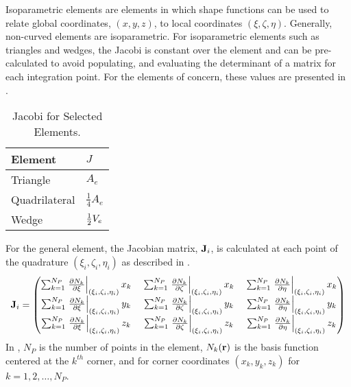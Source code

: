     Isoparametric elements are elements in which shape functions can be used to
    relate global coordinates, $(x,y,z)$, to local coordinates
    $(\xi,\zeta,\eta)$. Generally, non-curved elements are isoparametric. For
    isoparametric elements such as triangles and wedges, the Jacobi is constant
    over the element and can be pre-calculated to avoid populating, and
    evaluating the determinant of a matrix for each integration point. For the
    elements of concern, these values are presented in 
    \cite{textbookcolorado}.

    \begin{table}
      \caption{Jacobi for Selected Elements.}
      \label{tab:jacobi}
      \begin{center}
        \begin{tabular}{ll}
          \toprule
          Element & $J$ \\
          \midrule
          Triangle      & $A_e$ \\
          Quadrilateral & $\frac{1}{4} A_e$ \\
          Wedge         & $\frac{1}{2} V_e$ \\
          \bottomrule
        \end{tabular}
      \end{center}
    \end{table}

    For the general element, the Jacobian matrix, $\mathbf{J}_i$, is calculated at each
    point of the quadrature $(\xi_i,\zeta_i,\eta_i)$ as described in
    .
    \begin{equation}
      \label{eq:calcJacobian}
      \mathbf{J}_i = 
      \begin{pmatrix}
        \sum_{k=1}^{N_P} \left. \frac{\partial N_k}{\partial \xi}
          \right|_{(\xi_i,\zeta_i,\eta_i)} x_k   \; &
        \sum_{k=1}^{N_P} \left. \frac{\partial N_k}{\partial \zeta}
          \right|_{(\xi_i,\zeta_i,\eta_i)} x_k   \; &
        \sum_{k=1}^{N_P} \left. \frac{\partial N_k}{\partial \eta} 
          \right|_{(\xi_i,\zeta_i,\eta_i)} x_k   \\
        \sum_{k=1}^{N_P} \left. \frac{\partial N_k}{\partial \xi}
          \right|_{(\xi_i,\zeta_i,\eta_i)} y_k   \; &
        \sum_{k=1}^{N_P} \left. \frac{\partial N_k}{\partial \zeta} 
          \right|_{(\xi_i,\zeta_i,\eta_i)} y_k   \; &
        \sum_{k=1}^{N_P} \left. \frac{\partial N_k}{\partial \eta} 
          \right|_{(\xi_i,\zeta_i,\eta_i)} y_k   \\
        \sum_{k=1}^{N_P} \left. \frac{\partial N_k}{\partial \xi}
          \right|_{(\xi_i,\zeta_i,\eta_i)} z_k   \; &
        \sum_{k=1}^{N_P} \left. \frac{\partial N_k}{\partial \zeta} 
          \right|_{(\xi_i,\zeta_i,\eta_i)} z_k   \; &
        \sum_{k=1}^{N_P} \left. \frac{\partial N_k}{\partial \eta} 
          \right|_{(\xi_i,\zeta_i,\eta_i)} z_k   
      \end{pmatrix}
    \end{equation}
    In , $N_P$ is the number of points in the element, 
    $N_k(\mathbf{r})$ is the basis function centered at the $k^{th}$ corner, and 
    for corner coordinates $(x_k,y_k,z_k)$ for $k = 1,2,\ldots,N_P$.

